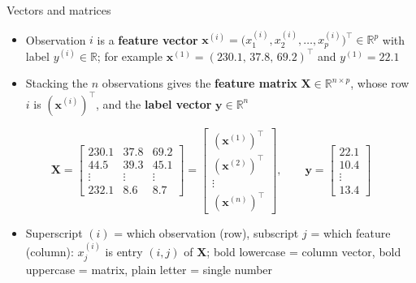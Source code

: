\begin{frame}{Vectors and matrices}
    \begin{itemize}
        \item Observation $i$ is a \textbf{feature vector} $\mathbf{x}^{(i)} = \big(x_1^{(i)}, x_2^{(i)}, \dots, x_p^{(i)}\big)^\top \in \mathbb{R}^p$ with label $y^{(i)} \in \mathbb{R}$; for example $\mathbf{x}^{(1)} = (230.1,\, 37.8,\, 69.2)^\top$ and $y^{(1)} = 22.1$
        \item Stacking the $n$ observations gives the \textbf{feature matrix} $\mathbf{X} \in \mathbb{R}^{n \times p}$, whose row $i$ is $(\mathbf{x}^{(i)})^\top$, and the \textbf{label vector} $\mathbf{y} \in \mathbb{R}^{n}$
    \end{itemize}
    \[
        \mathbf{X} = \begin{bmatrix} 230.1 & 37.8 & 69.2 \\ 44.5 & 39.3 & 45.1 \\ \vdots & \vdots & \vdots \\ 232.1 & 8.6 & 8.7 \end{bmatrix} = \begin{bmatrix} (\mathbf{x}^{(1)})^\top \\ (\mathbf{x}^{(2)})^\top \\ \vdots \\ (\mathbf{x}^{(n)})^\top \end{bmatrix}, \qquad \mathbf{y} = \begin{bmatrix} 22.1 \\ 10.4 \\ \vdots \\ 13.4 \end{bmatrix}
    \]
    \begin{itemize}
        \item Superscript $(i)$ = which observation (row), subscript $j$ = which feature (column): $x_j^{(i)}$ is entry $(i, j)$ of $\mathbf{X}$; bold lowercase = column vector, bold uppercase = matrix, plain letter = single number
    \end{itemize}
\end{frame}


